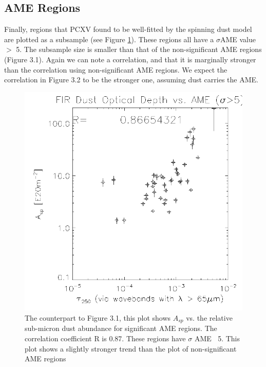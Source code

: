 \subsection{AME Regions}
     Finally, regions that PCXV found to be well-fitted by the spinning dust model are plotted as a subsample (see Figure \ref{fig:tauvsaspsp}). These regions all have a $\sigma$AME value $>$ 5. The subsample size is smaller than that of the non-significant AME regions (Figure 3.1). Again we can note a correlation, and that it is marginally stronger than the correlation using non-significant AME regions. We expect the correlation in Figure 3.2 to be the stronger one, assuming dust carries the AME.
\begin{figure}[!htbp]
\begin{center}
\includegraphics[width=150mm]{EPS/tau250vsAspsp_masterpres.pdf}
  \caption{The counterpart to Figure 3.1, this plot shows $A_{sp}$ vs. the relative sub-micron dust abundance for significant AME regions. The correlation coefficient R is 0.87. These regions have $\sigma$ AME $\>$ 5. This plot shows a slightly stronger trend than the plot of non-significant AME regions}
\label{fig:tauvsaspsp}
\end{center}
\end{figure}     
     

